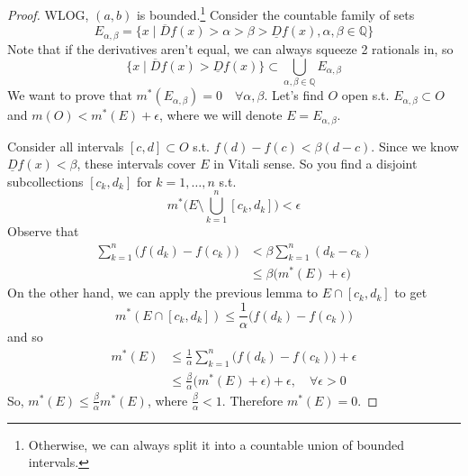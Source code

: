   \begin{proof}
    WLOG, $(a, b)$ is bounded.\footnote{Otherwise, we can always split it into a countable union of bounded intervals. } Consider the countable family of sets 
    \begin{equation}
      E_{\alpha, \beta} = \{x \mid \overline{D} f (x) > \alpha > \beta > \underline{D}f(x), \alpha, \beta \in \mathbb{Q} \}
    \end{equation}
    Note that if the derivatives aren't equal, we can always squeeze 2 rationals in, so 
    \begin{equation}
      \{x \mid \overline{D} f(x) > \underline{D} f(x) \} \subset \bigcup_{\alpha, \beta \in \mathbb{Q}} E_{\alpha, \beta}
    \end{equation}
    We want to prove that $m^\ast (E_{\alpha, \beta}) = 0 \quad \forall \alpha, \beta$. Let's find $O$ open s.t. $E_{\alpha, \beta} \subset O$ and $m(O) < m^\ast (E) + \epsilon$, where we will denote $E = E_{\alpha, \beta}$. 

    Consider all intervals $[c, d] \subset O$ s.t. $f(d) - f(c) < \beta (d - c)$. Since we know $\underline{D} f(x) < \beta$, these intervals cover $E$ in Vitali sense. So you find a disjoint subcollections $[c_k, d_k]$ for $k = 1, \ldots, n$ s.t. 
    \begin{equation}
      m^\ast \bigg( E \setminus \bigcup_{k=1}^n [c_k, d_k] \bigg) < \epsilon 
    \end{equation}
    Observe that 
    \begin{align}
      \sum_{k=1}^n \big( f(d_k) - f(c_k) \big) & < \beta \sum_{k=1}^n (d_k - c_k) \\ 
                                               & \leq \beta \big( m^\ast (E) + \epsilon \big)
    \end{align}
    On the other hand, we can apply the previous lemma to $E \cap [c_k, d_k]$ to get 
    \begin{equation}
      m^\ast (E \cap [c_k, d_k]) \leq \frac{1}{\alpha} \big( f(d_k) - f(c_k) \big) 
    \end{equation}
    and so 
    \begin{align}
      m^\ast (E) & \leq \frac{1}{\alpha} \sum_{k=1}^n \big( f(d_k) - f(c_k) \big) + \epsilon \\ 
                 & \leq \frac{\beta}{\alpha} \big( m^\ast(E) + \epsilon) + \epsilon, \quad \forall \epsilon > 0 
    \end{align}
    So, $m^\ast(E) \leq \frac{\beta}{\alpha} m^\ast (E)$, where $\frac{\beta}{\alpha} < 1$. Therefore $m^\ast (E) = 0$. 


\end{proof}
